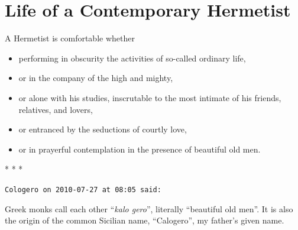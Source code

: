 \section{Life of a Contemporary Hermetist}

A Hermetist is comfortable whether

\begin{itemize}
\item performing in obscurity the activities of so-called ordinary life,
\item or in the company of the high and mighty,
\item or alone with his studies, inscrutable to the most intimate of his friends, relatives, and lovers,
\item or entranced by the seductions of courtly love,
\item or in prayerful contemplation in the presence of beautiful old men.
\end{itemize}


\begin{center}* * *\end{center}

\begin{footnotesize}
\begin{sffamily}
\texttt{Cologero on 2010-07-27 at 08:05 said:}

Greek monks call each other ``\emph{kalo gero}'', literally ``beautiful old men''. It is also the origin of the common Sicilian name, ``Calogero'', my father's given name.


\hfill

\end{sffamily}
\end{footnotesize}

